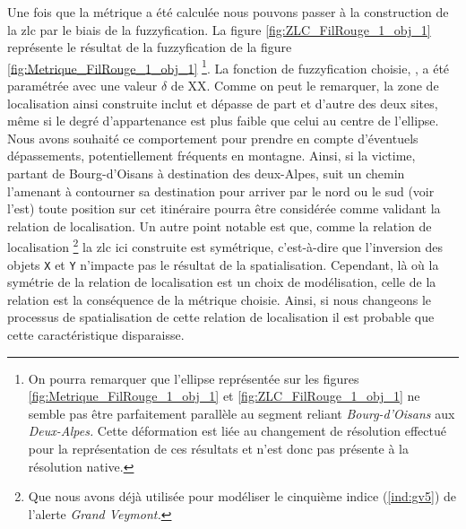 Une fois que la métrique a été calculée nous pouvons passer à la
construction de la \ac{zlc} par le biais de la fuzzyfication. La
figure \ref{fig:ZLC_FilRouge_1_obj_1} représente le résultat de la
fuzzyfication de la figure \ref{fig:Metrique_FilRouge_1_obj_1}
\footnote{On pourra remarquer que l'ellipse représentée sur les
  figures \ref{fig:Metrique_FilRouge_1_obj_1} et
  \ref{fig:ZLC_FilRouge_1_obj_1} ne semble pas être parfaitement
  parallèle au segment reliant \emph{Bourg-d'Oisans} aux
  \emph{Deux-Alpes.} Cette déformation est liée au changement de
  résolution effectué pour la représentation de ces résultats et n'est
  donc pas présente à la résolution native.}.
%
La fonction de fuzzyfication choisie, , a été
paramétrée avec une valeur \(\delta\) de XX.
%
Comme on peut le remarquer, la zone de localisation ainsi construite
inclut et dépasse de part et d'autre des deux sites, même si le degré
d'appartenance est plus faible que celui au centre de l'ellipse. Nous
avons souhaité ce comportement pour prendre en compte d'éventuels
dépassements, potentiellement fréquents en montagne. Ainsi, si la
victime, partant de Bourg-d'Oisans à destination des deux-Alpes, suit
un chemin l'amenant à contourner sa destination pour arriver par le
nord ou le sud (voir l'est) toute position sur cet itinéraire pourra
être considérée comme validant la relation de localisation.
%
Un autre point notable est que, comme la relation de localisation
 \footnote{Que nous avons déjà utilisée
  pour modéliser le cinquième indice (\ref{ind:gv5}) de l'alerte
  \emph{Grand Veymont.}} la \ac{zlc} ici construite est symétrique,
c'est-à-dire que l'inversion des objets \texttt{X} et \texttt{Y}
n'impacte pas le résultat de la spatialisation. Cependant, là où la
symétrie de la relation de localisation 
est un choix de modélisation, celle de la relation
 est la conséquence
de la métrique choisie. Ainsi, si nous changeons le processus de
spatialisation de cette relation de localisation il est probable que
cette caractéristique disparaisse.

